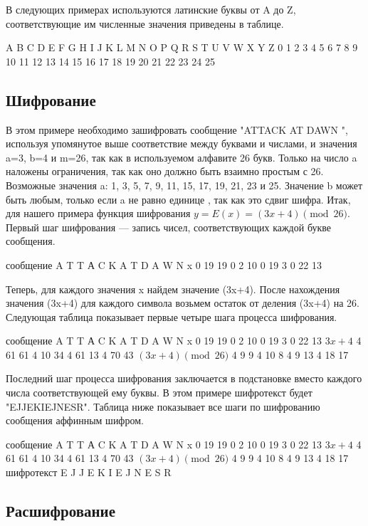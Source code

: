 В следующих примерах используются латинские буквы 
от A до Z, соответствующие им численные значения приведены в таблице.

A 	B 	C 	D 	E 	F 	G 	H 	I 	J 	K 	L 	M 	N 	O 	P 	Q 	R 	S 	T 	U 	V 	W 	X 	Y 	Z
0 	1 	2 	3 	4 	5 	6 	7 	8 	9 	10 	11 	12 	13 	14 	15 	16 	17 	18 	19 	20 	21 	22 	23 	24 	25


\subsection{Шифрование}

В этом примере необходимо зашифровать сообщение "ATTACK AT DAWN
", используя упомянутое выше соответствие между буквами и числами, 
и значения a=3, b=4 и m=26, так как в используемом алфавите 26 букв. 
Только на число a наложены ограничения, так как оно должно быть взаимно 
простым с 26. Возможные значения a: 1, 3, 5, 7, 9, 11, 15, 17, 19, 
21, 23 и 25. Значение b может быть любым, только если a не равно единице
, так как это сдвиг шифра. Итак, для нашего примера функция шифрования 
$y=E(x)=(3x+4)\pmod{26}$. Первый шаг шифрования — запись чисел, 
соответствующих каждой букве сообщения.

сообщение 	A 	T 	T 	А 	C 	K 	A 	T 	D 	A 	W 	N
x 	0 	19 	19 	0 	2 	10 	0 	19 	3 	0 	22 	13

Теперь, для каждого значения x найдем значение (3x+4). После нахождения 
значения (3x+4) для каждого символа возьмем остаток от деления (3x+4) 
на 26. Следующая таблица показывает первые четыре шага процесса 
шифрования.

сообщение 	A 	T 	T 	А 	C 	K 	A 	T 	D 	A 	W 	N
x 	0 	19 	19 	0 	2 	10 	0 	19 	3 	0 	22 	13
$3x+4$ 	4 	61 	61 	4 	10 	34 	4 	61 	13 	4 	70 	43
$(3x+4)\pmod{26}$ 	4 	9 	9 	4 	10 	8 	4 	9 	13 	4 	18 	17

Последний шаг процесса шифрования заключается в подстановке вместо каждого 
числа соответствующей ему буквы. В этом примере шифротекст будет 
"EJJEKIEJNESR". Таблица ниже показывает все шаги по шифрованию сообщения 
аффинным шифром.

сообщение 	A 	T 	T 	А 	C 	K 	A 	T 	D 	A 	W 	N
x 	0 	19 	19 	0 	2 	10 	0 	19 	3 	0 	22 	13
$3x+4$ 	4 	61 	61 	4 	10 	34 	4 	61 	13 	4 	70 	43
$(3x+4)\pmod{26}$ 	4 	9 	9 	4 	10 	8 	4 	9 	13 	4 	18 	17
шифротекст 	E 	J 	J 	E 	K 	I 	E 	J 	N 	E 	S 	R


\subsection{Расшифрование}


